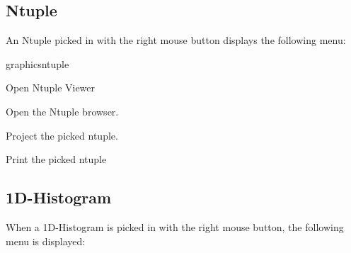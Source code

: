 \newpage

\subsection{Ntuple}
An Ntuple picked in \GW{} with the right mouse button displays
the following menu:

\begin{PAWf}[.23]{graphicsntuple}
\begin{DLsf}{Open Ntuple Viewer}
\item[Open Ntuple Viewer]     Open the Ntuple browser.
\item[Project...]             Project the picked ntuple.
\item[Print]                  Print the picked ntuple
\end{DLsf}
\end{PAWf}

\subsection{1D-Histogram}
When a 1D-Histogram is picked in \GW{} with the right mouse button,
the following menu is displayed:

